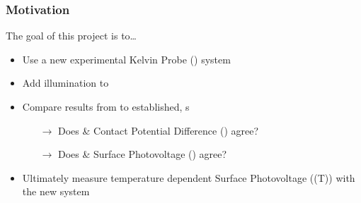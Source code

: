 \documentclass{beamer}
\begin{document}
\begin{frame}
\frametitle{Motivation}
\begin{block}{The goal of this project is to\dots}
	\begin{itemize}
		\item Use a new experimental Kelvin Probe (\kp{}) system
		\item Add illumination to  \kp{}
		\item Compare results from  \kp{} to established,  \kp{}s
		\begin{itemize}
			\item[$\rightarrow$] Does  \&  Contact Potential Difference (\cpd{}) agree?
			\item[$\rightarrow$] Does  \&  Surface Photovoltage (\spv{}) agree?
		\end{itemize}
		\item Ultimately measure temperature dependent Surface Photovoltage (\spv{}(T)) with the new system
	\end{itemize}
\end{block}\end{frame}
\end{document}
